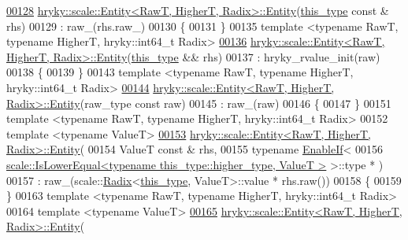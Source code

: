 \begin{DoxyCode}
\hypertarget{scale__entity_8h_source_l00128}{}\hyperlink{classhryky_1_1scale_1_1_entity_a3200eaffe5613c22fdd61ca962f193a0}{00128} \hyperlink{classhryky_1_1scale_1_1_entity}{hryky::scale::Entity<RawT, HigherT, Radix>::Entity}(\hyperlink{classhryky_1_1scale_1_1_entity}{this_type} \textcolor{keyword}{const} & rhs)
00129     : raw\_(rhs.raw\_)
00130 \{
00131 \}
00135 \textcolor{keyword}{template} <\textcolor{keyword}{typename} RawT, \textcolor{keyword}{typename} HigherT, hryky::\textcolor{keywordtype}{int}64\_t Radix>
\hypertarget{scale__entity_8h_source_l00136}{}\hyperlink{classhryky_1_1scale_1_1_entity_ae6d72480f79d0e666036870ccba763a6}{00136} \hyperlink{classhryky_1_1scale_1_1_entity}{hryky::scale::Entity<RawT, HigherT, Radix>::Entity}(\hyperlink{classhryky_1_1scale_1_1_entity}{this_type} && rhs)
00137     : hryky\_rvalue\_init(raw)
00138 \{
00139 \}
00143 \textcolor{keyword}{template} <\textcolor{keyword}{typename} RawT, \textcolor{keyword}{typename} HigherT, hryky::\textcolor{keywordtype}{int}64\_t Radix>
\hypertarget{scale__entity_8h_source_l00144}{}\hyperlink{classhryky_1_1scale_1_1_entity_aababe40f5fca9a4e7dc227854039fd06}{00144} \hyperlink{classhryky_1_1scale_1_1_entity}{hryky::scale::Entity<RawT, HigherT, Radix>::Entity}(raw\_type \textcolor{keyword}{const} raw)
00145     : raw\_(raw)
00146 \{
00147 \}
00151 \textcolor{keyword}{template} <\textcolor{keyword}{typename} RawT, \textcolor{keyword}{typename} HigherT, hryky::\textcolor{keywordtype}{int}64\_t Radix>
00152 \textcolor{keyword}{template} <\textcolor{keyword}{typename} ValueT>
\hypertarget{scale__entity_8h_source_l00153}{}\hyperlink{classhryky_1_1scale_1_1_entity_a1928287ec77e5a97d0b700d4406a5f54}{00153} \hyperlink{classhryky_1_1scale_1_1_entity}{hryky::scale::Entity<RawT, HigherT, Radix>::Entity}(
00154     ValueT \textcolor{keyword}{const} & rhs,
00155     \textcolor{keyword}{typename} \hyperlink{classhryky_1_1_enable_if}{EnableIf}<
00156         \hyperlink{classhryky_1_1scale_1_1_is_lower_equal}{scale::IsLowerEqual<typename this_type::higher_type, ValueT >} >::type *
      )
00157     : raw\_(scale::\hyperlink{classhryky_1_1scale_1_1_radix}{Radix}<\hyperlink{classhryky_1_1scale_1_1_entity}{this_type}, ValueT>::value * rhs.raw())
00158 \{
00159 \}
00163 \textcolor{keyword}{template} <\textcolor{keyword}{typename} RawT, \textcolor{keyword}{typename} HigherT, hryky::\textcolor{keywordtype}{int}64\_t Radix>
00164 \textcolor{keyword}{template} <\textcolor{keyword}{typename} ValueT>
\hypertarget{scale__entity_8h_source_l00165}{}\hyperlink{classhryky_1_1scale_1_1_entity_a1a7021b0210b2967d25f541371468947}{00165} \hyperlink{classhryky_1_1scale_1_1_entity}{hryky::scale::Entity<RawT, HigherT, Radix>::Entity}(

\end{DoxyCode}
